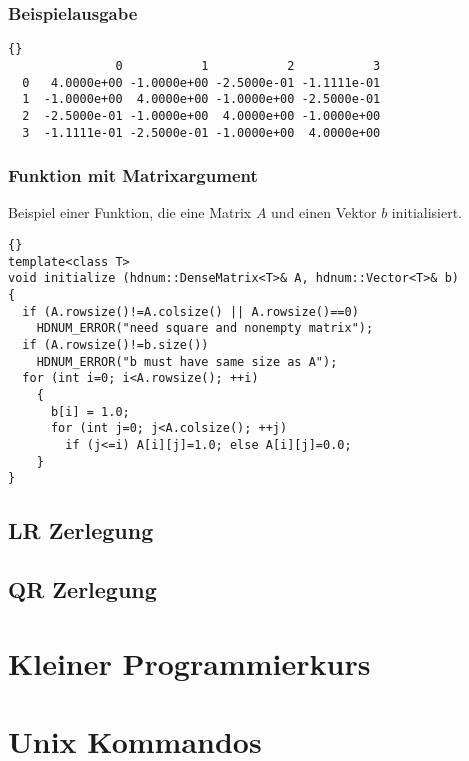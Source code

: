 \documentclass[a4paper,11pt]{article}
\theoremstyle{definition}
\begin{document}
\begin{frame}[fragile]
\frametitle{Beispielausgabe}
{\footnotesize{\begin{lstlisting}{}
               0           1           2           3
  0   4.0000e+00 -1.0000e+00 -2.5000e-01 -1.1111e-01
  1  -1.0000e+00  4.0000e+00 -1.0000e+00 -2.5000e-01
  2  -2.5000e-01 -1.0000e+00  4.0000e+00 -1.0000e+00
  3  -1.1111e-01 -2.5000e-01 -1.0000e+00  4.0000e+00
\end{lstlisting}}}
\end{frame}

\begin{frame}[fragile]
\frametitle{Funktion mit Matrixargument}
Beispiel einer Funktion, die eine Matrix $A$ und einen Vektor $b$
initialisiert.

{\footnotesize{\begin{lstlisting}{}
template<class T>
void initialize (hdnum::DenseMatrix<T>& A, hdnum::Vector<T>& b)
{
  if (A.rowsize()!=A.colsize() || A.rowsize()==0)
    HDNUM_ERROR("need square and nonempty matrix");
  if (A.rowsize()!=b.size())
    HDNUM_ERROR("b must have same size as A");
  for (int i=0; i<A.rowsize(); ++i)
    {
      b[i] = 1.0;
      for (int j=0; j<A.colsize(); ++j)
        if (j<=i) A[i][j]=1.0; else A[i][j]=0.0;
    }
}
\end{lstlisting}}}
\end{frame}

\subsection{LR Zerlegung}

\subsection{QR Zerlegung}

\begin{appendices}

\section{Kleiner Programmierkurs}

\section{Unix Kommandos}

\end{appendices}



 
\end{document}
